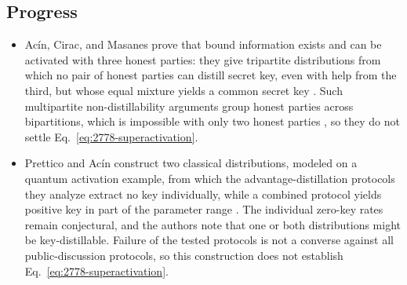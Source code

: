 \subsection*{Progress}

\begin{itemize}
  \item Ac\'in, Cirac, and Masanes prove that bound information exists and can be
  activated with three honest parties: they give tripartite distributions
  from which no pair of honest parties can distill secret key, even with help
  from the third, but whose equal mixture yields a common secret key
  .  Such multipartite non-distillability
  arguments group honest parties across bipartitions, which is impossible
  with only two honest parties , so they do
  not settle Eq.~\eqref{eq:2778-superactivation}.

  \item Prettico and Ac\'in construct two classical distributions, modeled on a
  quantum activation example, from which the advantage-distillation protocols
  they analyze extract no key individually, while a combined protocol yields
  positive key in part of the parameter range
  .  The individual zero-key rates remain
  conjectural, and the authors note that one or both distributions might be
  key-distillable.  Failure of the tested protocols is not a converse against
  all public-discussion protocols, so this construction does not establish
  Eq.~\eqref{eq:2778-superactivation}.


\end{itemize}
